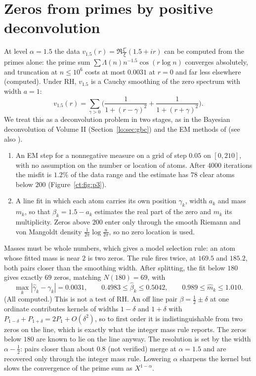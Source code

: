 \section{Zeros from primes by positive deconvolution}\label{ct:sec:deconv}

At level $\alpha=1.5$ the data $v_{1.5}(r)=\Re\frac{\xi'}{\xi}(1.5+ir)$ can be computed from the primes alone: the prime sum $\sum\Lambda(n)n^{-1.5}\cos(r\log n)$ converges absolutely, and truncation at $n\le10^6$ costs at most $0.0031$ at $r=0$ and far less elsewhere (computed).
 Under RH, $v_{1.5}$ is a Cauchy smoothing of the zero spectrum with width $a=1$:
\[
v_{1.5}(r)=\sum_{\gamma>0}\Big(\frac{1}{1+(r-\gamma)^2}+\frac{1}{1+(r+\gamma)^2}\Big).
\]
We treat this as a deconvolution problem in two stages, as in the Bayesian deconvolution of Volume II (Section~\ref{lo:sec:gbc}) and the EM methods of \cite{Richardson72,Lucy74,VardiLee93} (see also \cite{PadillaPolsonScott18}).
\begin{enumerate}
\item An EM step for a nonnegative measure on a grid of step $0.05$ on $[0,210]$, with no assumption on the number or location of atoms. After $4000$ iterations the misfit is $1.2\%$ of the data range and the estimate has $78$ clear atoms below $200$ (Figure~\ref{ct:fig:p3}).
\item A line fit in which each atom carries its own position $\gamma_k$, width $a_k$ and mass $m_k$, so that $\beta_k=1.5-a_k$ estimates the real part of the zero and $m_k$ its multiplicity. Zeros above $200$ enter only through the smooth Riemann and von Mangoldt density $\frac1{2\pi}\log\frac u{2\pi}$, so no zero location is used.
\end{enumerate}
Masses must be whole numbers, which gives a model selection rule: an atom whose fitted mass is near $2$ is two zeros. The rule fires twice, at $169.5$ and $185.2$, both pairs closer than the smoothing width. After splitting, the fit below $180$ gives exactly $69$ zeros, matching $N(180)=69$, with
\[
\max_k|\hat\gamma_k-\gamma_k|=0.0031,\qquad0.4983\le\hat\beta_k\le0.5042,\qquad0.989\le\hat m_k\le1.010 .
\]
(All computed.) %
This is not a test of RH. An off line pair $\beta=\frac12\pm\delta$ at one ordinate contributes kernels of widths $1-\delta$ and $1+\delta$ with $P_{1-\delta}+P_{1+\delta}=2P_1+O(\delta^2)$, so to first order it is indistinguishable from two zeros on the line, which is exactly what the integer mass rule reports. The zeros below $180$ are known to lie on the line anyway. The resolution is set by the width $\alpha-\frac12$: pairs closer than about $0.8$ (not verified) merge at $\alpha=1.5$ and are recovered only through the integer mass rule. Lowering $\alpha$ sharpens the kernel but slows the convergence of the prime sum as $X^{1-\alpha}$.

